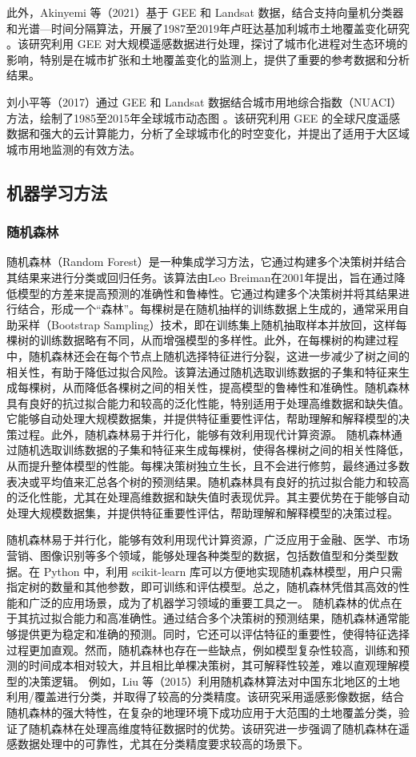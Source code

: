 \documentclass{article}
\begin{document}
	此外，Akinyemi 等（2021）基于 GEE 和 Landsat 数据，结合支持向量机分类器和光谱—时间分隔算法，开展了1987至2019年卢旺达基加利城市土地覆盖变化研究 \cite{Akinyemi2021}。该研究利用 GEE 对大规模遥感数据进行处理，探讨了城市化进程对生态环境的影响，特别是在城市扩张和土地覆盖变化的监测上，提供了重要的参考数据和分析结果。
	
	刘小平等（2017）通过 GEE 和 Landsat 数据结合城市用地综合指数（NUACI）方法，绘制了1985至2015年全球城市动态图 \cite{Liu2017}。该研究利用 GEE 的全球尺度遥感数据和强大的云计算能力，分析了全球城市化的时空变化，并提出了适用于大区域城市用地监测的有效方法。
	\subsection{机器学习方法}
	
	\subsubsection{随机森林}
	随机森林（Random Forest）是一种集成学习方法，它通过构建多个决策树并结合其结果来进行分类或回归任务。该算法由Leo Breiman在2001年提出，旨在通过降低模型的方差来提高预测的准确性和鲁棒性。它通过构建多个决策树并将其结果进行结合，形成一个“森林”。每棵树是在随机抽样的训练数据上生成的，通常采用自助采样（Bootstrap Sampling）技术，即在训练集上随机抽取样本并放回，这样每棵树的训练数据略有不同，从而增强模型的多样性。此外，在每棵树的构建过程中，随机森林还会在每个节点上随机选择特征进行分裂，这进一步减少了树之间的相关性，有助于降低过拟合风险。该算法通过随机选取训练数据的子集和特征来生成每棵树，从而降低各棵树之间的相关性，提高模型的鲁棒性和准确性。随机森林具有良好的抗过拟合能力和较高的泛化性能，特别适用于处理高维数据和缺失值。它能够自动处理大规模数据集，并提供特征重要性评估，帮助理解和解释模型的决策过程。此外，随机森林易于并行化，能够有效利用现代计算资源。
	随机森林通过随机选取训练数据的子集和特征来生成每棵树，使得各棵树之间的相关性降低，从而提升整体模型的性能。每棵决策树独立生长，且不会进行修剪，最终通过多数表决或平均值来汇总各个树的预测结果。随机森林具有良好的抗过拟合能力和较高的泛化性能，尤其在处理高维数据和缺失值时表现优异。其主要优势在于能够自动处理大规模数据集，并提供特征重要性评估，帮助理解和解释模型的决策过程。

	
	随机森林易于并行化，能够有效利用现代计算资源，广泛应用于金融、医学、市场营销、图像识别等多个领域，能够处理各种类型的数据，包括数值型和分类型数据。在 Python 中，利用 scikit-learn 库可以方便地实现随机森林模型，用户只需指定树的数量和其他参数，即可训练和评估模型。总之，随机森林凭借其高效的性能和广泛的应用场景，成为了机器学习领域的重要工具之一。
	随机森林的优点在于其抗过拟合能力和高准确性。通过结合多个决策树的预测结果，随机森林通常能够提供更为稳定和准确的预测。同时，它还可以评估特征的重要性，使得特征选择过程更加直观。然而，随机森林也存在一些缺点，例如模型复杂性较高，训练和预测的时间成本相对较大，并且相比单棵决策树，其可解释性较差，难以直观理解模型的决策逻辑。
	例如，Liu 等（2015）利用随机森林算法对中国东北地区的土地利用/覆盖进行分类，并取得了较高的分类精度。该研究采用遥感影像数据，结合随机森林的强大特性，在复杂的地理环境下成功应用于大范围的土地覆盖分类，验证了随机森林在处理高维度特征数据时的优势\cite{liu2015}。该研究进一步强调了随机森林在遥感数据处理中的可靠性，尤其在分类精度要求较高的场景下。
	
\end{document}

